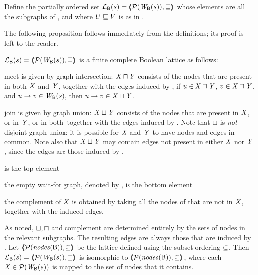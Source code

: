 \begin{definition} \label{defn:wflattice}
Define the partially ordered set $\lat{\B}{s} = \tpl{ \wfgS{\B}{s}, \subg }$ %
whose elements are all the subgraphs of 
, and where  $U \subg V$ is as in .   
\end{definition}

The following proposition follows immediately from the definitions; its proof is left to the reader.
\begin{proposition} \label{prop:isALattice}
$\lat{\B}{s} = \tpl{ \wfgS{\B}{s}, \subg }$ is a finite complete Boolean lattice as follows:
\be

\item meet is given by graph intersection: 
$\XS \meet \YS$ consists of the nodes that are present in both $\XS$ and $\YS$, together with the edges induced by , 
\ie if $u \in \XS \meet \YS$, $v \in \XS \meet \YS$, and $u \ar v \in  \wfg{\B}{s}$, then $u \ar v \in  \XS \meet \YS$.

\item join is given by graph union: $\XS \join \YS$ consists of the nodes that are present in $\XS$, or in $\YS$, or in both, together with 
 the edges induced by .
 Note that $\join$ is \emph{not} disjoint graph union: 
it is possible for $\XS$ and $\YS$ to have nodes and edges in common. Note also that $\XS \join \YS$ may contain edges not present in either $\XS$ nor $\YS$,
since the edges are those induced by . 

\item {}  is the top element 

\item  the empty wait-for graph, denoted by \ewfg, is the bottom element

\item the complement \compl{\XS} of $\XS$ is obtained by taking all the nodes of  that are not in $\XS$, together with the induced edges.
\ee
\end{proposition}
%
As noted, $\join, \meet$ and complement are determined entirely by the sets of nodes in the relevant subgraphs. The resulting edges are always those
that are induced by .
Let $\tpl{ \nodesPow{\B}, \sub }$ be the lattice defined using the subset ordering $\sub$. 
Then $\lat{\B}{s} = \tpl{ \wfgPow{\B}{s}, \subg }$ is isomorphic to $\tpl{ \nodesPow{\B}, \sub }$, 
where each $\XS \in \wfgPow{\B}{s}$ is mapped to the set of nodes that it contains.


